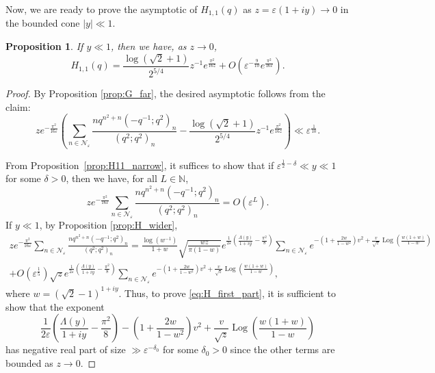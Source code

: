 \documentclass[11pt,reqno]{amsart}
\newtheorem{proposition}[theorem]{Proposition}
\theoremstyle{remark}
\numberwithin{equation}{section}
\def\Log{\operatorname{Log}}
\def\Log{\operatorname{Log}}
\begin{document}
Now, we are ready to prove the asymptotic of $H_{1,1}(q)$ as $z=\varepsilon(1+iy) \to 0$ in the bounded cone $|y|\ll 1$. 
\begin{proposition}\label{prop:H11_asymp}
	If $y \ll 1$, then we have, as $z \to 0$, 
	\[
		H_{1,1}(q) = \frac{\log(\sqrt{2}+1) }{2^{5/4}}  z^{-1} e^{\frac{\pi^2}{16 z}} + O\left(\varepsilon^{-\frac{9}{10}} e^{\frac{\pi^2}{16\varepsilon}}\right).
	\]
\end{proposition}
\begin{proof}
By Proposition \ref{prop:G_far},  the desired asymptotic follows from the claim:
\[
	z e^{-\frac{\pi^2}{16\varepsilon}} \left(\sum_{n \in \mathcal{N}_{\varepsilon}} \frac{ n q^{n^2+n} (-q^{-1};q^2)_n}{(q^2;q^2)_n} - \frac{\log(\sqrt{2}+1) }{2^{5/4}}  z^{-1} e^{\frac{\pi^2}{16 z}} \right) \ll \varepsilon^{\frac{1}{10}} .
\]

From Proposition~\ref{prop:H11_narrow}, it suffices to show that if $\varepsilon^{\frac12-\delta}\ll y \ll 1$ for some $\delta>0$, then we have, for all $L \in \mathbb{N}$,
\begin{equation}\label{eq:H_first_part}
	z e^{-\frac{\pi^2}{16\varepsilon}}\sum_{n \in \mathcal{N}_{\varepsilon}} \frac{ n q^{n^2+n} (-q^{-1};q^2)_n}{(q^2;q^2)_n} = O\left(\varepsilon^L\right).
\end{equation}
If $y \ll 1$, by Proposition \ref{prop:H_wider},
\begin{align*}
	z e^{-\frac{\pi^2}{16\varepsilon}}\sum_{n \in \mathcal{N}_{\varepsilon}}  \frac{ n q^{n^2+n} (-q^{-1};q^2)_n}{(q^2;q^2)_n} 
	= \frac{\log(w^{-1})}{1+w} \sqrt{\frac{w z}{\pi(1-w)}} e^{\frac{1}{2\varepsilon}\left(\frac{\Lambda(y)}{1+iy}-\frac{\pi^2}{8}\right)} \sum_{n \in \mathcal{N}_{\varepsilon}} e^{-\left(1+\frac{2w}{1-w^2}\right)v^2 +\frac{v}{\sqrt{z}} \Log\left(\frac{w(1+w)}{1-w}\right)}\\
    + O\left(\varepsilon^{\frac15}\right) \sqrt{z} e^{\frac{1}{2\varepsilon}\left(\frac{\Lambda(y)}{1+iy}-\frac{\pi^2}{8}\right)} \sum_{n \in \mathcal{N}_{\varepsilon}}  e^{-\left(1+\frac{2w}{1-w^2}\right)v^2 +\frac{v}{\sqrt{z}} \Log\left(\frac{w(1+w)}{1-w}\right)},
\end{align*}
where $w = (\sqrt{2}-1)^{1+iy}$.
Thus, to prove \eqref{eq:H_first_part}, it is sufficient to show that the exponent
\begin{equation}\label{eq:H_exp}
	\frac{1}{2\varepsilon}\left(\frac{\Lambda(y)}{1+iy}-\frac{\pi^2}{8}\right) -\left(1+\frac{2w}{1-w^2}\right)v^2 +\frac{v}{\sqrt{z}} \Log\left(\frac{w(1+w)}{1-w}\right)
\end{equation}
has negative real part of size $\gg \varepsilon^{-\delta_0}$ for some $\delta_0>0$ since the other terms are bounded as $z\to 0$. 



\end{proof}
\end{document}
